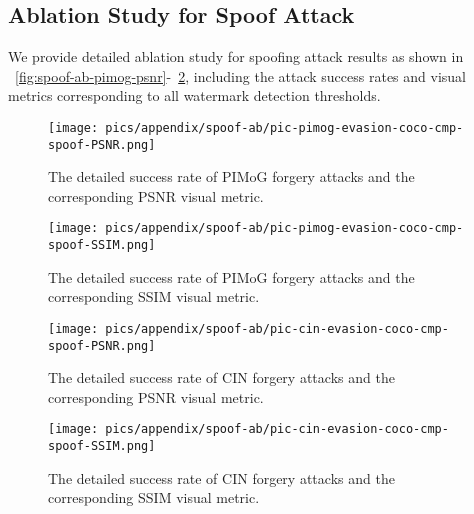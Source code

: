 \subsection{Ablation Study for Spoof Attack}
\label{sec:appendix:Ablation_Study_for_Spoof_Attack}
We provide detailed ablation study for spoofing attack results as shown in ~\cref{fig:spoof-ab-pimog-psnr}-~\cref{fig:spoof-ab-cin-ssim}, including the attack success rates and visual metrics corresponding to all watermark detection thresholds.

\begin{figure}[!t]
\begin{minipage}{0.48\linewidth}
    \centering
    \texttt{[image: pics/appendix/spoof-ab/pic-pimog-evasion-coco-cmp-spoof-PSNR.png]} 
    \vspace{-6mm}
    \caption{The detailed success rate of PIMoG forgery attacks and the corresponding PSNR visual metric.}
    \label{fig:spoof-ab-pimog-psnr}
\end{minipage}\hfill
\begin{minipage}{0.48\linewidth}
    \centering
    \texttt{[image: pics/appendix/spoof-ab/pic-pimog-evasion-coco-cmp-spoof-SSIM.png]} 
    \vspace{-6mm}
    \caption{The detailed success rate of PIMoG forgery attacks and the corresponding SSIM visual metric.}
    \label{fig:spoof-ab-pimog-ssim}
\end{minipage}
\end{figure}

\begin{figure}[!t]
\begin{minipage}{0.48\linewidth}
    \centering
    \texttt{[image: pics/appendix/spoof-ab/pic-cin-evasion-coco-cmp-spoof-PSNR.png]} 
    \vspace{-6mm}
    \caption{The detailed success rate of CIN forgery attacks and the corresponding PSNR visual metric.}
    \label{fig:spoof-ab-cin-psnr}
\end{minipage}\hfill
\begin{minipage}{0.48\linewidth}
    \centering
    \texttt{[image: pics/appendix/spoof-ab/pic-cin-evasion-coco-cmp-spoof-SSIM.png]} 
    \vspace{-6mm}
    \caption{The detailed success rate of CIN forgery attacks and the corresponding SSIM visual metric.}
    \label{fig:spoof-ab-cin-ssim}
\end{minipage}
\end{figure}



